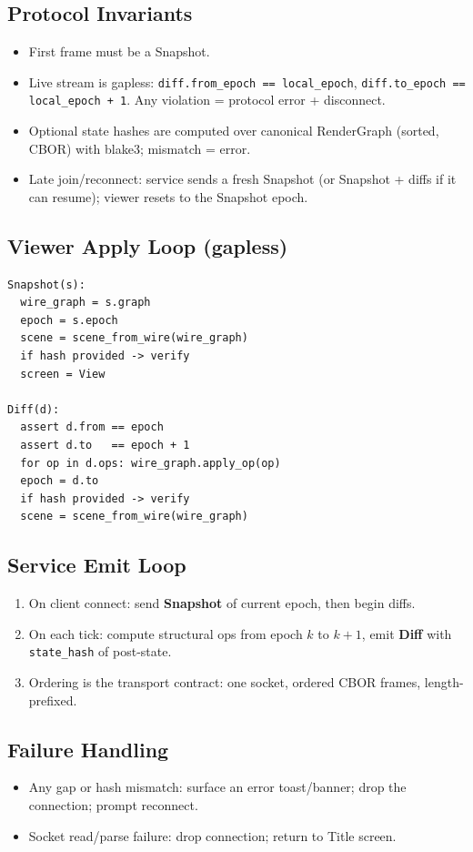 \subsection{Protocol Invariants}
\begin{itemize}
  \item First frame must be a Snapshot.
  \item Live stream is gapless: \texttt{diff.from\_epoch == local\_epoch}, \texttt{diff.to\_epoch == local\_epoch + 1}. Any violation = protocol error + disconnect.
  \item Optional state hashes are computed over canonical RenderGraph (sorted, CBOR) with blake3; mismatch = error.
  \item Late join/reconnect: service sends a fresh Snapshot (or Snapshot + diffs if it can resume); viewer resets to the Snapshot epoch.
\end{itemize}

\subsection{Viewer Apply Loop (gapless)}
\begin{verbatim}
Snapshot(s):
  wire_graph = s.graph
  epoch = s.epoch
  scene = scene_from_wire(wire_graph)
  if hash provided -> verify
  screen = View

Diff(d):
  assert d.from == epoch
  assert d.to   == epoch + 1
  for op in d.ops: wire_graph.apply_op(op)
  epoch = d.to
  if hash provided -> verify
  scene = scene_from_wire(wire_graph)
\end{verbatim}

\subsection{Service Emit Loop}
\begin{enumerate}
  \item On client connect: send \textbf{Snapshot} of current epoch, then begin diffs.
  \item On each tick: compute structural ops from epoch $k$ to $k+1$, emit \textbf{Diff} with \texttt{state\_hash} of post-state.
  \item Ordering is the transport contract: one socket, ordered CBOR frames, length-prefixed.
\end{enumerate}

\subsection{Failure Handling}
\begin{itemize}
  \item Any gap or hash mismatch: surface an error toast/banner; drop the connection; prompt reconnect.
  \item Socket read/parse failure: drop connection; return to Title screen.
\end{itemize}

